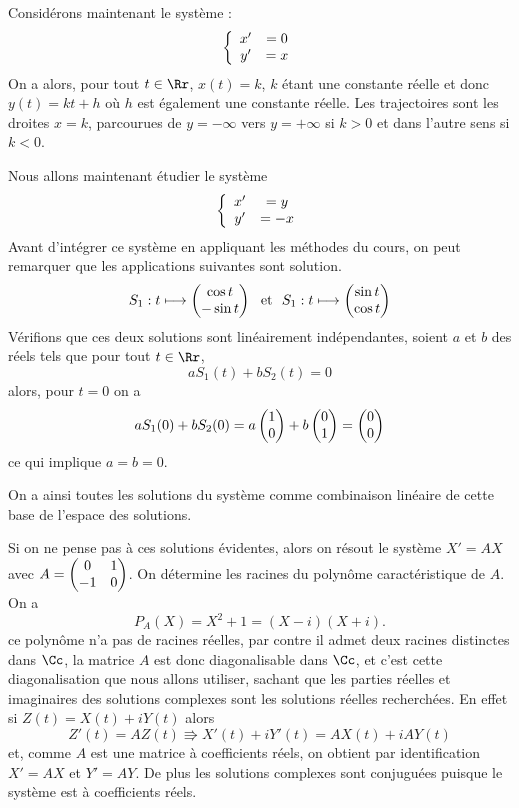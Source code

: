 \documentclass[class=report,crop=false]{standalone}
\begin{document}
\begin{exemple}
Considérons maintenant le système :
$$\left\{\begin{array}{cc}x'&=0\cr y'&=x\end{array}\right.$$
On a alors, pour tout $t\in\Rr$, $x(t)=k$, $k$ étant une 
constante réelle et donc $y(t)=kt+h$ où $h$ est également une 
constante réelle. Les trajectoires sont les droites $x=k$, 
parcourues  de $y=-\infty$ vers $y=+\infty$ si $k>0$ et dans l'autre sens si $k<0$.
\end{exemple}


\begin{exemple}
Nous allons maintenant étudier le système
$$\left\{\begin{array}{cc}x'&=y\cr y'&=-x\end{array}\right.$$
Avant d'intégrer ce système en appliquant les méthodes du cours, 
on peut remarquer que les applications suivantes sont solution.
$$S_1 :t\longmapsto \left(\begin{matrix}\cos t\cr-\sin t\end{matrix}\right)\ \ {\hbox{et}}\ \ 
S_1 :t\longmapsto \left(\begin{matrix}\sin t\cr \cos t\end{matrix}\right)$$
Vérifions que ces deux solutions sont linéairement indépendantes, 
soient $a$ et $b$ des réels tels que pour tout $t\in\Rr$, 
$$aS_1(t)+bS_2(t)=0$$
alors, pour $t=0$ on a 
$$aS_1(0)+bS_2(0)=a\left(\begin{matrix}1\cr 0\end{matrix}\right)+b\left(\begin{matrix}0\cr 1\end{matrix}\right)
=\left(\begin{matrix}0\cr 0\end{matrix}\right)$$ 
ce qui implique $a=b=0$. 

On a ainsi toutes les solutions du système comme combinaison 
linéaire de cette base de l'espace des solutions.

Si on ne pense pas à ces solutions évidentes, alors on résout le système $X'=AX$ avec 
$A=\left(\begin{matrix}0&1\cr -1&0\end{matrix}\right)$. 
On détermine les racines du polynôme caractéristique de $A$. On a
$$P_A(X)=X^2+1=(X-i)(X+i).$$
ce polynôme n'a pas de racines réelles, par contre il admet deux 
racines distinctes dans $\Cc$, la matrice $A$ est donc diagonalisable 
dans $\Cc$, et c'est cette diagonalisation que nous allons utiliser, 
sachant que les parties réelles et imaginaires des solutions complexes 
sont les solutions réelles recherchées. En effet
si $Z(t)=X(t)+iY(t)$ alors
$$Z'(t)=AZ(t)\Rrightarrow X'(t)+iY'(t)=AX(t)+iAY(t)$$
et, comme $A$ est une matrice à coefficients réels, on obtient par 
identification $X'=AX$ et $Y'=AY$. De plus les solutions complexes 
sont conjuguées puisque le système est à coefficients réels.


\end{exemple}
\end{document}

